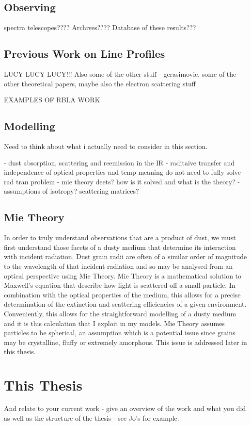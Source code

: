\subsection{Observing}
spectra telescopes????  Archives????  Database of these results???

\subsection{Previous Work on Line Profiles}
LUCY LUCY LUCY!!!  Also some of the other stuff - gerasimovic, some of the other theoretical papers, maybe also the electron scattering stuff


EXAMPLES OF RBLA WORK
\subsection{Modelling}
Need to think about what i actually need to consider in this section.

- dust absorption, scattering and reemission in the IR
- raditaive transfer and independence of optical properties and temp meaning do not need to fully solve rad tran problem
- mie theory deets?  how is it solved and what is the theory?
- assumptions of isotropy?  scattering matrices?
\subsection{Mie Theory}

In order to truly understand observations that are a product of dust, we must first understand those facets of a dusty medium that determine its interaction with incident radiation.  Dust grain radii are often of a similar order of magnitude to the wavelength of that incident radiation and so may be analysed from an optical perspective using Mie Theory.  Mie Theory is a mathematical solution to Maxwell's equation that describe how light is scattered off a small particle.  In combination with the optical properties of the medium, this allows for a precise determination of the extinction and scattering efficiencies of a given environment.  Conveniently, this allows for the straightforward modelling of a dusty medium and it is this calculation that I exploit in my models.  Mie Theory assumes particles to be spherical, an assumption which is a potential issue since grains may be crystalline, fluffy or extremely amorphous.  This issue is addressed later in this thesis.



\section{This Thesis}
And relate to your current work - give an overview of the work and what you did as well as the structure of the thesis - see Jo's for example.
